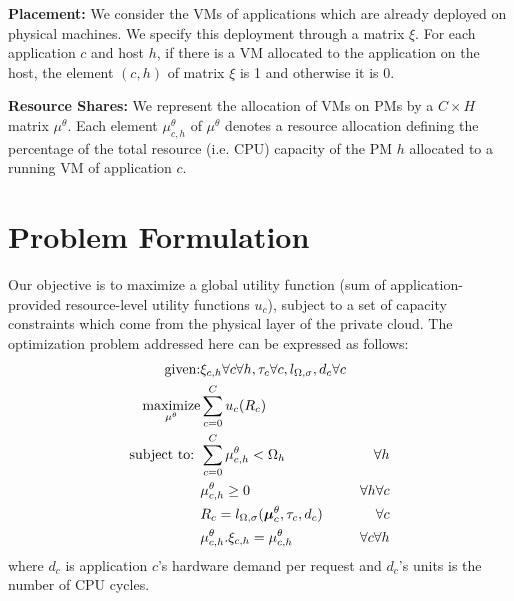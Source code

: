 \textbf{Placement:} 
 We consider the VMs of applications which are already deployed on physical machines.
 We specify this deployment through a matrix $\xi$. For each application $c$ and host $h$, if there is a VM allocated to the application on the host, the element $(c,h)$ of matrix $\xi$ is 1 and otherwise  it is 0. 

\textbf{Resource Shares:}
 We represent the allocation of VMs on PMs by a $C \times H$ matrix $\mu^\theta$. Each element $\mu^\theta_{c,h}$ of $\mu^\theta$ denotes a resource allocation defining the percentage of the total resource (i.e. CPU) capacity of the PM $h$ allocated to a running VM of application $c$.  

\section{Problem Formulation}  
\label{sec:contribution2-problem-formulation} 
 Our objective is to maximize a global utility function (sum of application-provided resource-level utility functions $u_c$), subject to a set of capacity constraints which come from the physical layer of the private cloud. 
The optimization problem addressed here can be expressed as follows:
\begin{equation} \label{eq:opt-def}
\begin{split}
\text{given:} 
& \xi_{c,h} \forall c\forall h,
 \tau_c \forall c,l_{\Omega,\sigma},
 d_{c} \forall c\\
\underset{\mu^\theta}{\text{maximize}} & \sum_{c=0}^{C} u_c(R_c)   \\
\text{subject to: } 
& \sum_{c=0}^{C}{\mu^\theta_{c,h}}<\Omega_h \ & \forall h  \\
&  \mu^\theta_{c,h} \geq 0 & \forall h\forall c \\
& R_c=l_{\Omega,\sigma}(\boldsymbol\mu^\theta_{c},\tau_c,d_{c}) & \forall c \\
& \mu^\theta_{c,h}.\xi_{c,h}=\mu^\theta_{c,h} & \forall c \forall h
\end{split}
\end{equation}
where 
$d_c$ is application $c$'s hardware demand per request and $d_{c}$'s units is the number of CPU cycles.
 
